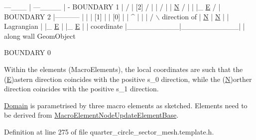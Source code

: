\begin{DoxyCode}
                     ---\_\_\_
                    |      ---\_\_\_\_
                    |              -   BOUNDARY 1
                    |               /  
                    |     [2]      /  |  
                    |             /     | 
                    | \hyperlink{namespaceoomph_1_1QuadTreeNames_a8954a5947b19986b8c4b755bc7639f7dabc60bec4cc294aa2adf92726c6d6823a}{N}          /        |  
                    | |\_ \hyperlink{namespaceoomph_1_1QuadTreeNames_a8954a5947b19986b8c4b755bc7639f7da585070bd0e3801c3bbed287ef3c4a265}{E}      /          |    
     BOUNDARY 2     |-----------           |  
                    |          |    [1]    |
                    |   [0]    |           |  ^
                    |          |           | / \(\backslash\)  direction of
                    | \hyperlink{namespaceoomph_1_1QuadTreeNames_a8954a5947b19986b8c4b755bc7639f7dabc60bec4cc294aa2adf92726c6d6823a}{N}        |    \hyperlink{namespaceoomph_1_1QuadTreeNames_a8954a5947b19986b8c4b755bc7639f7dabc60bec4cc294aa2adf92726c6d6823a}{N}      |  |   Lagrangian 
                    | |\_ \hyperlink{namespaceoomph_1_1QuadTreeNames_a8954a5947b19986b8c4b755bc7639f7da585070bd0e3801c3bbed287ef3c4a265}{E}     |    |\_ \hyperlink{namespaceoomph_1_1QuadTreeNames_a8954a5947b19986b8c4b755bc7639f7da585070bd0e3801c3bbed287ef3c4a265}{E}   |  |   coordinate 
                    |\_\_\_\_\_\_\_\_\_\_|\_\_\_\_\_\_\_\_\_\_\_|  |   along wall GeomObject

                         BOUNDARY 0

Within the elements (MacroElements), the local coordinates
are such that the (\hyperlink{namespaceoomph_1_1QuadTreeNames_a8954a5947b19986b8c4b755bc7639f7da585070bd0e3801c3bbed287ef3c4a265}{E})astern direction coincides with the positive 
s\_0 direction,  \textcolor{keywordflow}{while} the (\hyperlink{namespaceoomph_1_1QuadTreeNames_a8954a5947b19986b8c4b755bc7639f7dabc60bec4cc294aa2adf92726c6d6823a}{N})orther direction coincides with the positive 
s\_1 direction.
\end{DoxyCode}


\hyperlink{classoomph_1_1Domain}{Domain} is parametrised by three macro elements as sketched. Elements need to be derived from \hyperlink{classoomph_1_1MacroElementNodeUpdateElementBase}{Macro\+Element\+Node\+Update\+Element\+Base}. 

Definition at line 275 of file quarter\+\_\+circle\+\_\+sector\+\_\+mesh.\+template.\+h.



